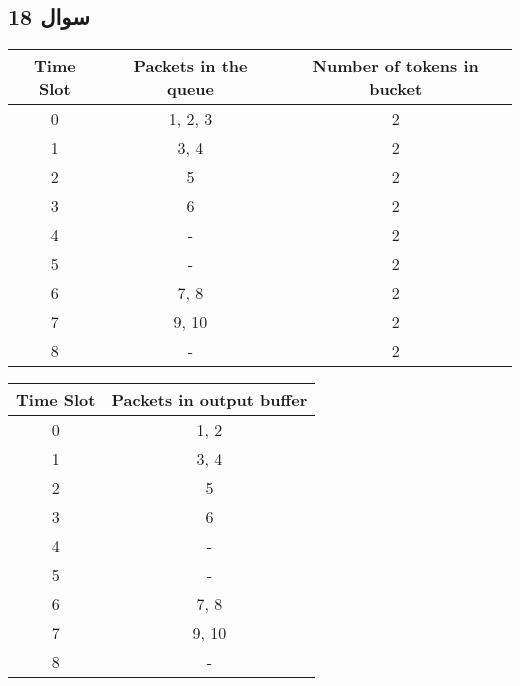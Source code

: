 \documentclass{article}
\begin{document}
\subsection{سوال 18}

\begin{latin}
\begin{table}[H]
\begin{tabular}{|c|c|c|}
\hline
\textbf{Time Slot} & \textbf{Packets in the queue} & \textbf{Number of tokens in bucket} \\ \hline
0                  & 1, 2, 3                       & 2                                   \\ \hline
1                  & 3, 4                          & 2                                   \\ \hline
2                  & 5                             & 2                                   \\ \hline
3                  & 6                             & 2                                   \\ \hline
4                  & -                             & 2                                   \\ \hline
5                  & -                             & 2                                   \\ \hline
6                  & 7, 8                          & 2                                   \\ \hline
7                  & 9, 10                         & 2                                   \\ \hline
8                  & -                             & 2                                   \\ \hline
\end{tabular}
\end{table}

\begin{table}[H]
\begin{tabular}{|c|c|}
\hline
\textbf{Time Slot} & \textbf{Packets in output buffer} \\ \hline
0                  & 1, 2                              \\ \hline
1                  & 3, 4                              \\ \hline
2                  & 5                                 \\ \hline
3                  & 6                                 \\ \hline
4                  & -                                 \\ \hline
5                  & -                                 \\ \hline
6                  & 7, 8                              \\ \hline
7                  & 9, 10                             \\ \hline
8                  & -                                 \\ \hline
\end{tabular}
\end{table}

\end{latin}
\end{document}

